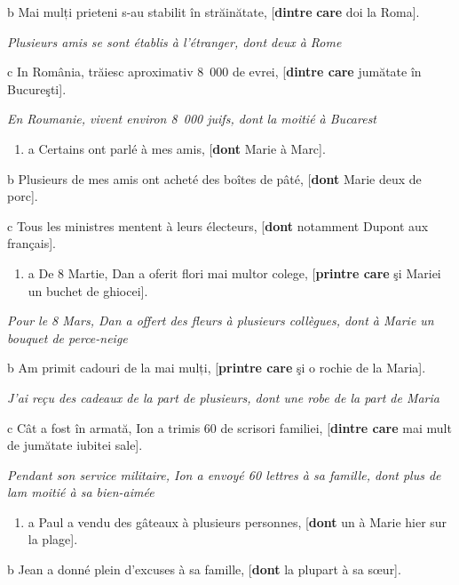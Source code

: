   b  Mai mulți prieteni s-au stabilit în străinătate, [\textbf{dintre} \textbf{care} doi la Roma].

{\itshape
Plusieurs amis se sont établis à l'étranger, dont deux à Rome}

  c  In România, trăiesc aproximativ 8~000 de evrei, [\textbf{dintre care} jumătate în Bucureşti].

{\itshape
En Roumanie, vivent environ 8~000 juifs, dont la moitié à Bucarest}


\begin{enumerate}
\item \label{bkm:Ref293353982}a  Certains ont parlé à mes amis, [\textbf{dont} Marie à Marc].


\end{enumerate}
  b  Plusieurs de mes amis ont acheté des boîtes de pâté, [\textbf{dont} Marie deux de porc].

  c  Tous les ministres mentent à leurs électeurs, [\textbf{dont} notamment Dupont aux français]. 


\begin{enumerate}
\item \label{bkm:Ref293353999}a  De 8 Martie, Dan a oferit flori mai multor colege, [\textbf{printre care} şi Mariei un buchet de ghiocei]. 


\end{enumerate}
{\itshape
Pour le 8 Mars, Dan a offert des fleurs à plusieurs collègues, dont à Marie un bouquet de perce-neige} 

  b  Am primit cadouri de la mai mulți, [\textbf{printre care} şi o rochie de la Maria].

{\itshape
J'ai reçu des cadeaux de la part de plusieurs, dont une robe de la part de Maria}

  c  Cât a fost în armată, Ion a trimis 60 de scrisori familiei, [\textbf{dintre care} mai mult de jumătate iubitei sale].

{\itshape
Pendant son service militaire, Ion a envoyé 60 lettres à sa famille, dont plus de lam moitié à sa bien-aimée}


\begin{enumerate}
\item \label{bkm:Ref293354001}a  Paul a vendu des gâteaux à plusieurs personnes, [\textbf{dont} un à Marie hier sur la plage].


\end{enumerate}
  b  Jean a donné plein d'excuses à sa famille, [\textbf{dont} la plupart à sa s{\oe}ur].


